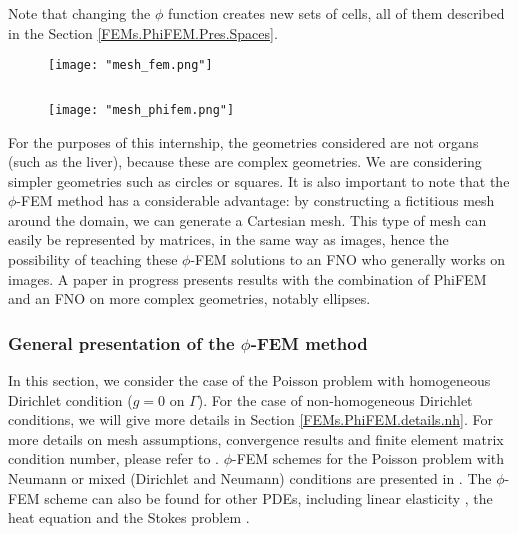 \begin{Rem}
	Note that changing the $\phi$ function creates new sets of cells, all of them described in the Section \ref{FEMs.PhiFEM.Pres.Spaces}.
\end{Rem}

\begin{minipage}{0.52\linewidth}
	\begin{figure}[H]
		\centering
		\texttt{[image: "mesh\_fem.png"]}
		\label{mesh_fem}
	\end{figure}
\end{minipage} $\qquad$
\begin{minipage}{0.44\linewidth}
	\begin{figure}[H]
		\centering
		\texttt{[image: "mesh\_phifem.png"]}
		\label{mesh_phifem}
	\end{figure}
\end{minipage}

\begin{Rem}
	For the purposes of this internship, the geometries considered are not organs (such as the liver), because these are complex geometries. We are considering simpler geometries such as circles or squares. It is also important to note that the $\phi$-FEM method has a considerable advantage: by constructing a fictitious mesh around the domain, we can generate a Cartesian mesh. This type of mesh can easily be represented by matrices, in the same way as images, hence the possibility of teaching these $\phi$-FEM solutions to an FNO who generally works on images. A paper in progress presents results with the combination of PhiFEM and an FNO on more complex geometries, notably ellipses.
\end{Rem}

\subsubsection{General presentation of the $\phi$-FEM method} \label{FEMs.PhiFEM.Pres}

In this section, we consider the case of the Poisson problem with homogeneous Dirichlet condition ($g=0$ on $\Gamma$). For the case of non-homogeneous Dirichlet conditions, we will give more details in Section \ref{FEMs.PhiFEM.details.nh}. For more details on mesh assumptions, convergence results and finite element matrix condition number, please refer to \cite{duprez_phi-fem_2020}. $\phi$-FEM schemes for the Poisson problem with Neumann or mixed (Dirichlet and Neumann) conditions are presented in \cite{duprez_new_2023,cotin_phi-fem_nodate}. The $\phi$-FEM scheme can also be found for other PDEs, including linear elasticity \cite[Chapter~2]{cotin_phi-fem_nodate}, the heat equation \cite[Chapter~5]{cotin_phi-fem_nodate} and the Stokes problem  \cite{duprez_phi-fem_2023}.

